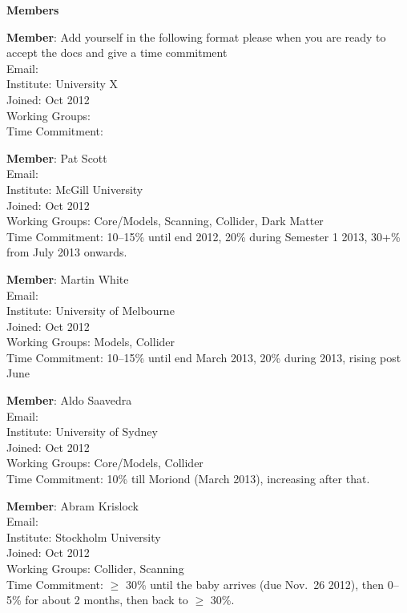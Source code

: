

\centerline{\textbf{Members}}\bigskip 

\textbf{Member}: Add yourself in the following format please when you are ready to accept the docs and give a time commitment\\
Email: \\
Institute: University X\\
Joined: Oct 2012\\
Working Groups:\\
Time Commitment: 

\textbf{Member}: Pat Scott\\
Email: \\
Institute: McGill University\\
Joined: Oct 2012\\
Working Groups: Core/Models, Scanning, Collider, Dark Matter \\
Time Commitment: 10--15\% until end 2012, 20\% during Semester 1 2013, 30+\% from July 2013 onwards.

\textbf{Member}: Martin White\\
Email: \\
Institute: University of Melbourne\\
Joined: Oct 2012\\
Working Groups: Models, Collider\\
Time Commitment: 10–15\% until end March 2013, 20\% during 2013, rising post June

\textbf{Member}: Aldo Saavedra\\
Email: \\
Institute: University of Sydney\\
Joined: Oct 2012\\
Working Groups: Core/Models, Collider\\
Time Commitment: 10\% till Moriond (March 2013), increasing after that. 

\textbf{Member}: Abram Krislock\\
Email: \\
Institute: Stockholm University\\
Joined: Oct 2012\\
Working Groups: Collider, Scanning\\
Time Commitment: $\ge$ 30\% until the baby arrives (due Nov.\ 26 2012), then 0--5\% for about 2 months, then back to $\ge$ 30\%. 

